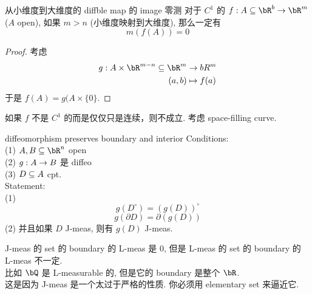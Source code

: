 \documentclass[lang=cn,11pt]{elegantbook}
\begin{document}
\begin{corollary}{从小维度到大维度的 diffble map 的 image 零测}
    对于 $C^1$ 的 $f: A \sub \bR^b \rar \bR^m $($A$ open), 如果 $m > n$ (小维度映射到大维度), 那么一定有 
    $$
    m(f(A)) = 0
    $$
\end{corollary}
\begin{proof}
    考虑
    \begin{align}
        g: A \times \bR^{m-n} \sub \bR^m &\rar bR^m\\
        (a,b) & \mapsto f(a)
    \end{align}
    于是 $f(A) = g(A \times \{0\}$.
\end{proof}
\begin{remark}
    如果 $f$ 不是 $C^1$ 的而是仅仅只是连续，则不成立. 考虑 space-filling curve.\\
\end{remark}



\begin{theorem}{diffeomorphism preserves boundary and interior}
Conditions:\\
(1) $A,B \sub \bR^n$ open\\
(2) $g: A \rightarrow B$ 是 diffeo\\
(3) $D \subseteq A$ cpt.\\
Statement:\\
(1) 
$$
g(D^{\circ}) = (g(D))^{\circ}
$$
$$
g(\partial D) = \partial(g(D))
$$
(2) 并且如果 $D$ J-meas, 则有 $g(D)$ J-meas.
\end{theorem}
\begin{remark}
    J-meas 的 set 的 boundary 的 L-meas 是 0, 但是 L-meas 的 set 的 boundary 的 L-meas 不一定.\\
    比如 $\bQ$ 是 L-measurable 的, 但是它的 boundary 是整个 $\bR$.\\
    这是因为 J-meas 是一个太过于严格的性质. 你必须用 elementary set 来逼近它.
\end{remark}
\end{document}
